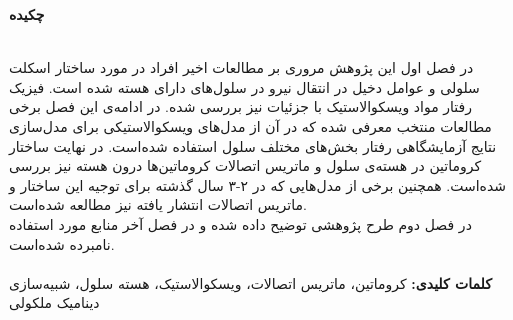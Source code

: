 \thispagestyle{empty}
\noindent
\centerline{\textbf{\large{چکیده}}} \\
در فصل اول این پژوهش مروری بر مطالعات اخیر افراد در مورد ساختار اسکلت سلولی و عوامل دخیل در انتقال نیرو در سلول‌های دارای هسته شده است. فیزیک رفتار مواد ویسکوالاستیک با جزئیات نیز بررسی شده‌. در ادامه‌ی این فصل برخی مطالعات منتخب معرفی شده‌ که در آن از مدل‌های ویسکوالاستیکی برای  مدل‌سازی نتایج آزمایشگاهی رفتار بخش‌های مختلف سلول استفاده شده‌است. در نهایت ساختار کروماتین در هسته‌ی سلول و ماتریس اتصالات کروماتین‌ها درون هسته نیز بررسی شده‌است. همچنین برخی از مدل‌هایی که در ۲-۳ سال گذشته برای توجیه این ساختار و ماتریس اتصالات انتشار یافته نیز مطالعه شده‌است. \\
در فصل دوم طرح پژوهشی توضیح داده شده و در فصل آخر منابع مورد استفاده نامبرده شده‌است.
\\
\\
\textbf{کلمات کلیدی:}
کروماتین، ماتریس اتصالات، ویسکوالاستیک، هسته سلول، شبیه‌سازی دینامیک ملکولی
\textit{}